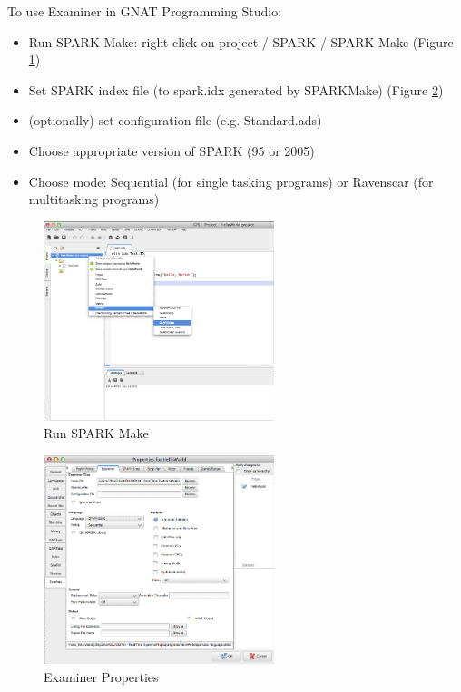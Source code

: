 
To use Examiner in GNAT Programming Studio:
\begin{itemize}
	\item Run SPARK Make: right click on project / SPARK / SPARK Make (Figure \ref{figure:sparkmake})
	\item Set SPARK index file (to spark.idx generated by SPARKMake) (Figure \ref{figure:examinerproperties})
	\item (optionally) set configuration file (e.g. Standard.ads)
	\item Choose appropriate version of SPARK (95 or 2005)
	\item Choose mode: Sequential (for single tasking programs) or Ravenscar (for multitasking programs)
\end{itemize}

\begin{figure}[ht]%
    \begin{center}
    	\includegraphics[width=0.6\textwidth]{figures/SPARKMake.png}    	
    \end{center}
    \caption{Run SPARK Make}
    \label{figure:sparkmake}
\end{figure}

\begin{figure}[ht]%
    \begin{center}
    	\includegraphics[width=0.6\textwidth]{figures/Properties-Switches-Examiner.png}    	
    \end{center}
    \caption{Examiner Properties}
    \label{figure:examinerproperties}
\end{figure}

